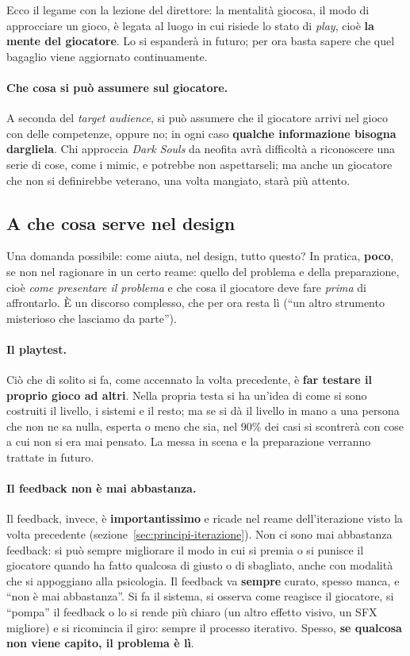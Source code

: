 Ecco il legame con la lezione del direttore: la mentalità giocosa, il modo di
approcciare un gioco, è legata al luogo in cui risiede lo stato di
\emph{play}, cioè \textbf{la mente del giocatore}. Lo si espanderà in futuro;
per ora basta sapere che quel bagaglio viene aggiornato continuamente.

\paragraph{Che cosa si può assumere sul giocatore.} A seconda del
\emph{target audience}, si può assumere che il giocatore arrivi nel gioco
con delle competenze, oppure no; in ogni caso \textbf{qualche informazione
bisogna dargliela}. Chi approccia \emph{Dark Souls} da neofita avrà
difficoltà a riconoscere una serie di cose, come i mimic, e potrebbe non
aspettarseli; ma anche un giocatore che non si definirebbe veterano, una
volta mangiato, starà più attento.

\subsection{A che cosa serve nel design}

Una domanda possibile: come aiuta, nel design, tutto questo? In pratica,
\textbf{poco}, se non nel ragionare in un certo reame: quello del problema e
della preparazione, cioè \emph{come presentare il problema} e che cosa il
giocatore deve fare \emph{prima} di affrontarlo. È un discorso complesso, che
per ora resta lì (``un altro strumento misterioso che lasciamo da parte'').

\paragraph{Il playtest.} Ciò che di solito si fa, come accennato la volta
precedente, è \textbf{far testare il proprio gioco ad altri}. Nella propria
testa si ha un'idea di come si sono costruiti il livello, i sistemi e il
resto; ma se si dà il livello in mano a una persona che non ne sa nulla,
esperta o meno che sia, nel 90\% dei casi si scontrerà con cose a cui non si
era mai pensato. La messa in scena e la preparazione verranno trattate in
futuro.

\paragraph{Il feedback non è mai abbastanza.} Il feedback, invece, è
\textbf{importantissimo} e ricade nel reame dell'iterazione visto la volta
precedente (sezione~\ref{sec:principi-iterazione}). Non ci sono mai
abbastanza feedback: si può sempre migliorare il modo in cui si premia o si
punisce il giocatore quando ha fatto qualcosa di giusto o di sbagliato,
anche con modalità che si appoggiano alla psicologia. Il feedback va
\textbf{sempre} curato, spesso manca, e ``non è mai abbastanza''. Si fa il
sistema, si osserva come reagisce il giocatore, si ``pompa'' il feedback o lo
si rende più chiaro (un altro effetto visivo, un SFX migliore) e si ricomincia
il giro: sempre il processo iterativo. Spesso, \textbf{se qualcosa non viene
capito, il problema è lì}.

